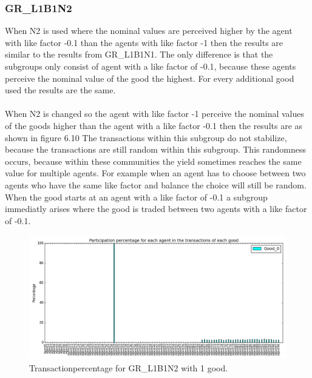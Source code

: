 \documentclass[twoside,openright]{uva-bachelor-thesis}
\begin{document}
\newpage

\subsubsection{GR\_L1B1N2}
When N2 is used where the nominal values are perceived higher by the agent with like factor -0.1 than the agents with like factor -1 then the results are similar to the results from GR\_L1B1N1. The only difference is that the subgroups only consist of agent with a like factor of -0.1, because these agents perceive the nominal value of the good the highest. For every additional good used the results are the same.
\\
\\
When N2 is changed so the agent with like factor -1 perceive the nominal values of the goods higher than the agent with a like factor -0.1 then the results are as shown in figure 6.10  The transactions within this subgroup do not stabilize, because the transactions are still random within this subgroup. This randomness occurs, because within these communities the yield sometimes reaches the same value for multiple agents. For example when an agent has to choose between two agents who have the same like factor and balance the choice will still be random.
When the good starts at an agent with a like factor of -0.1 a subgroup immediatly arises where the good is traded between two agents with a like factor of -0.1.\\
\begin{figure}[h!]
  \centering
\includegraphics[scale=0.4]{Simulation_figures/GR_L1B1N2/321_1good} 
  \caption{Transactionpercentage for GR\_L1B1N2 with 1 good.}
\end{figure}
\end{document}
